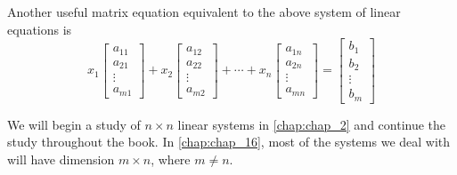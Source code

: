 \documentclass[../main.tex]{subfiles}
\begin{document}
Another useful matrix equation equivalent to the above system of linear equations is
$$
x_{1}\left[\begin{array}{l}
a_{11} \\
a_{21} \\
\vdots \\
a_{m 1}
\end{array}\right]+x_{2}\left[\begin{array}{l}
a_{12} \\
a_{22} \\
\vdots \\
a_{m 2}
\end{array}\right]+\cdots+x_{n}\left[\begin{array}{l}
a_{1 n} \\
a_{2 n} \\
\vdots \\
a_{m n}
\end{array}\right]=\left[\begin{array}{l}
b_{1} \\
b_{2} \\
\vdots \\
b_{m}
\end{array}\right]
$$

We will begin a study of $n \times n$ linear systems in \autoref{chap:chap_2} and continue the study throughout the book. In \autoref{chap:chap_16}, most of the systems we deal with will have dimension $m \times n$, where $m \neq n$.
\end{document}
